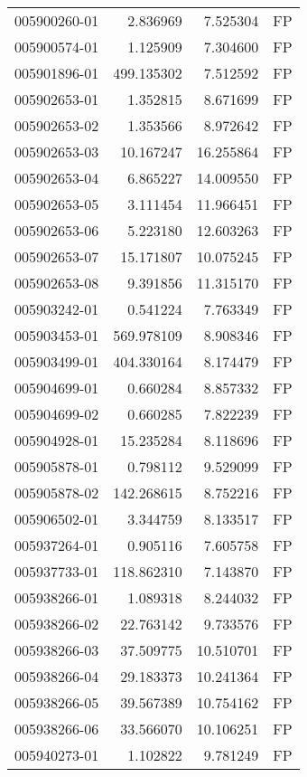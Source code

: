 \begin{tabular}{lrrl}
005900260-01 &    2.836969 &     7.525304 &   FP \\
005900574-01 &    1.125909 &     7.304600 &   FP \\
005901896-01 &  499.135302 &     7.512592 &   FP \\
005902653-01 &    1.352815 &     8.671699 &   FP \\
005902653-02 &    1.353566 &     8.972642 &   FP \\
005902653-03 &   10.167247 &    16.255864 &   FP \\
005902653-04 &    6.865227 &    14.009550 &   FP \\
005902653-05 &    3.111454 &    11.966451 &   FP \\
005902653-06 &    5.223180 &    12.603263 &   FP \\
005902653-07 &   15.171807 &    10.075245 &   FP \\
005902653-08 &    9.391856 &    11.315170 &   FP \\
005903242-01 &    0.541224 &     7.763349 &   FP \\
005903453-01 &  569.978109 &     8.908346 &   FP \\
005903499-01 &  404.330164 &     8.174479 &   FP \\
005904699-01 &    0.660284 &     8.857332 &   FP \\
005904699-02 &    0.660285 &     7.822239 &   FP \\
005904928-01 &   15.235284 &     8.118696 &   FP \\
005905878-01 &    0.798112 &     9.529099 &   FP \\
005905878-02 &  142.268615 &     8.752216 &   FP \\
005906502-01 &    3.344759 &     8.133517 &   FP \\
005937264-01 &    0.905116 &     7.605758 &   FP \\
005937733-01 &  118.862310 &     7.143870 &   FP \\
005938266-01 &    1.089318 &     8.244032 &   FP \\
005938266-02 &   22.763142 &     9.733576 &   FP \\
005938266-03 &   37.509775 &    10.510701 &   FP \\
005938266-04 &   29.183373 &    10.241364 &   FP \\
005938266-05 &   39.567389 &    10.754162 &   FP \\
005938266-06 &   33.566070 &    10.106251 &   FP \\
005940273-01 &    1.102822 &     9.781249 &   FP \\

\end{tabular}
